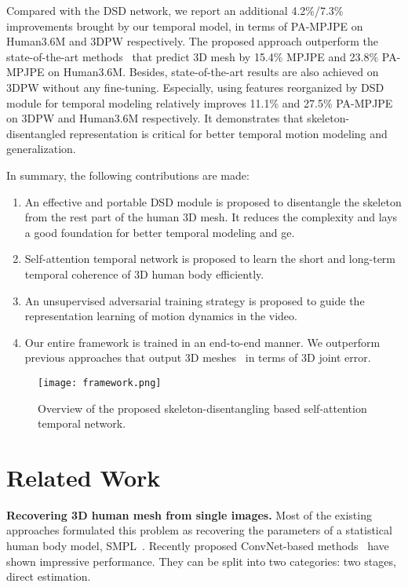 \documentclass[10pt,twocolumn,letterpaper]{article}
\begin{document}
Compared with the DSD network, we report an additional 4.2\%/7.3\% improvements brought by our temporal model, in terms of PA-MPJPE on Human3.6M and 3DPW respectively. The proposed approach outperform the state-of-the-art methods~\cite{kanazawa2018learning,yoshiyasu2018skeleton} that predict 3D mesh by 15.4\% MPJPE and 23.8\% PA-MPJPE on Human3.6M. Besides, state-of-the-art results are also achieved on 3DPW without any fine-tuning. Especially, using features reorganized by DSD module for temporal modeling relatively improves 11.1\% and 27.5\% PA-MPJPE on 3DPW and Human3.6M respectively. It demonstrates that skeleton-disentangled representation is critical for better temporal motion modeling and generalization.

In summary, the following contributions are made:
\begin{enumerate}
\item An effective and portable DSD module is proposed to disentangle the skeleton from the rest part of the human 3D mesh. It reduces the complexity and lays a good foundation for better temporal modeling and ge.
\item Self-attention temporal network is proposed to learn the short and long-term temporal coherence of 3D human body efficiently. 
\item An unsupervised adversarial training strategy is proposed to guide the representation learning of motion dynamics in the video. 
\item Our entire framework is trained in an end-to-end manner. We outperform previous approaches that output 3D meshes~\cite{hmr,kanazawa2018learning,humanshape,yoshiyasu2018skeleton} in terms of 3D joint error.
\end{enumerate}

\label{sec:intro}
 \begin{figure*}
	\begin{center}
		\texttt{[image: framework.png]}
		\caption{Overview of the proposed skeleton-disentangling based self-attention temporal network.}
		\label{fig:flowchart}
	\end{center}
\end{figure*}

\section{Related Work}
\label{sec:related work}
\textbf{Recovering 3D human mesh from single images.}
Most of the existing approaches formulated this problem as recovering the parameters of a statistical human body model, SMPL~\cite{smpl}. Recently proposed ConvNet-based methods~\cite{hmr,neuralbodyfitting,self,humanshape,yoshiyasu2018skeleton,unite,monocap,monoperfcap} have shown impressive performance. They can be split into two categories: two stages, direct estimation. 
\end{document}
